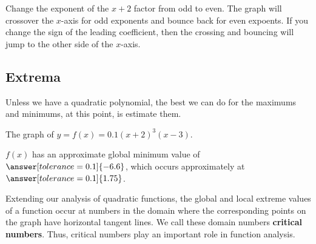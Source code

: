 \documentclass{ximera}
\begin{document}
\begin{example}

Change the exponent of the $x+2$ factor from odd to even.  The graph will crossover the $x$-axis for odd exponents and bounce back for even expoents.  If you change the sign of the leading coefficient, then the crossing and bouncing will jump to the other side of the $x$-axis.



\begin{center}
\end{center}

\end{example}






















\subsection*{Extrema}

Unless we have a quadratic polynomial, the best we can do for the maximums and minimums, at this point, is estimate them.







\begin{example}

The graph of $y = f(x) = 0.1(x+2)^3(x-3)$.



\begin{center}
\end{center}



$f(x)$ has an approximate global minimum value of $\answer[tolerance=0.1]{-6.6}$, which occurs approximately at $\answer[tolerance=0.1]{1.75}$.


\end{example}




Extending our analysis of quadratic functions, the global and local extreme values of a function occur at numbers in the domain where the corresponding points on the graph have horizontal tangent lines. We call these domain numbers \textbf{critical numbers}.  Thus, critical numbers play an important role in function analysis.  
\end{document}
